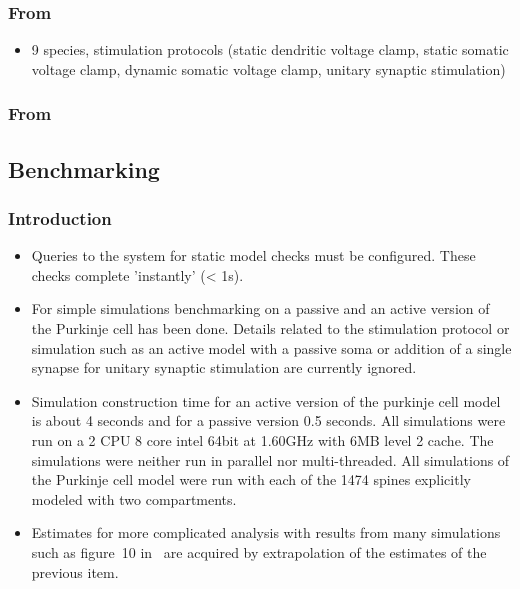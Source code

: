 \documentclass[12pt]{article}
\begin{document}
\subsubsection*{From~\cite{bower09:_compar_evolut_comput_analy_cereb}}

\begin{itemize}
\item 9 species, stimulation protocols (static dendritic voltage
  clamp, static somatic voltage clamp, dynamic somatic voltage
  clamp, unitary synaptic stimulation)
\end{itemize}

\subsubsection*{From~\cite{coop09:_using_purkin}}


\subsection*{Benchmarking}

\subsubsection*{Introduction}

\begin{itemize}
\item Queries to the system for static model checks must be
  configured.  These checks complete 'instantly' (< 1s).
\item For simple simulations benchmarking on a passive and an active
  version of the Purkinje cell has been done.  Details related to the
  stimulation protocol or simulation such as an active model with a
  passive soma or addition of a single synapse for unitary synaptic
  stimulation are currently ignored.
\item Simulation construction time for an active version of the
  purkinje cell model is about 4 seconds and for a passive version 0.5
  seconds.  All simulations were run on a 2 CPU 8 core intel 64bit at
  1.60GHz with 6MB level 2 cache.  The simulations were neither run in
  parallel nor multi-threaded.  All simulations of the Purkinje cell
  model were run with each of the 1474 spines explicitly modeled with
  two compartments.
\item Estimates for more complicated analysis with results from many
  simulations such as figure~10 in~\cite{E:1994hc} are acquired by
  extrapolation of the estimates of the previous item.
\end{itemize}
\end{document}
